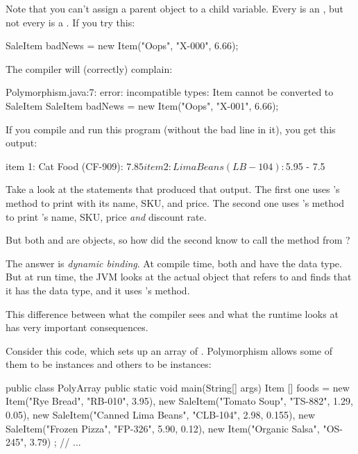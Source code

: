 Note that you can't assign a parent object to a child variable. Every  is an , but not every  is a . If you try this:

\begin{code}
SaleItem badNews = new Item("Oops", "X-000", 6.66);
\end{code}

The compiler will (correctly) complain:

\begin{stdout}
Polymorphism.java:7: error: incompatible types:
  Item cannot be converted to SaleItem
        SaleItem badNews = new Item("Oops", "X-001", 6.66);
\end{stdout}

If you compile and run this program (without the bad line in it), you get this output:

\begin{stdout}
item 1: Cat Food (CF-909): $7.85
item 2: Lima Beans (LB-104): $5.95 - 7.5%
\end{stdout}

Take a look at the  statements that produced that output. The first one uses 's  method to print  with its name, SKU, and price.  The second one uses 's  method to print 's name, SKU, price {\em and} discount rate.

But both  and  are  objects, so how did the second  know to call the  method from ?


The answer is {\em dynamic binding}. At compile time, both  and  have the  data type. But at  run time, the JVM looks at the actual object that  refers to and finds that it has the  data type, and it uses 's  method.

This difference between what the compiler sees and what the runtime looks at has very important consequences.

Consider this code, which sets up an array of . Polymorphism allows some of them to be  instances and others to be  instances:

\begin{code}
public class PolyArray {
    public static void main(String[] args) {
        Item [] foods = {
            new Item("Rye Bread", "RB-010", 3.95),
            new SaleItem("Tomato Soup", "TS-882", 1.29, 0.05),
            new SaleItem("Canned Lima Beans", "CLB-104",
                2.98, 0.155),
            new SaleItem("Frozen Pizza", "FP-326",
                5.90, 0.12),
            new Item("Organic Salsa", "OS-245", 3.79)
        };
// ...
    }
}
\end{code}

